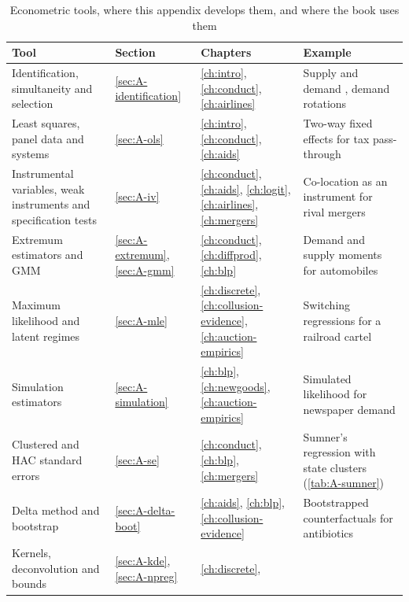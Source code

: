 \begin{table}[htbp]
\centering
\caption{Econometric tools, where this appendix develops them, and where the book uses them}
\label{tab:A-map}
\footnotesize
\begin{tabularx}{\textwidth}{@{}>{\raggedright\arraybackslash}p{}
>{\raggedright\arraybackslash}p{} >{\raggedright\arraybackslash}p{}
>{\raggedright\arraybackslash}X@{}}
\toprule
Tool & Section & Chapters & Example \\
\midrule
Identification, simultaneity and selection & \ref{sec:A-identification} & \ref{ch:intro}, \ref{ch:conduct},
\ref{ch:airlines} & Supply and demand \citep{Working1927}, demand rotations \citep{Bresnahan1982} \\
\addlinespace
Least squares, panel data and systems & \ref{sec:A-ols} & \ref{ch:intro}, \ref{ch:conduct}, \ref{ch:aids} &
Two-way fixed effects for tax pass-through \citep{Sumner1981} \\
\addlinespace
Instrumental variables, weak instruments and specification tests & \ref{sec:A-iv} & \ref{ch:conduct},
\ref{ch:aids}, \ref{ch:logit}, \ref{ch:airlines}, \ref{ch:mergers} & Co-location as an instrument for rival mergers
\citep{Dafny2009} \\
\addlinespace
Extremum estimators and GMM & \ref{sec:A-extremum}, \ref{sec:A-gmm} & \ref{ch:conduct}, \ref{ch:diffprod},
\ref{ch:blp} & Demand and supply moments for automobiles \citep{BerryLevinsohnPakes1995} \\
\addlinespace
Maximum likelihood and latent regimes & \ref{sec:A-mle} & \ref{ch:discrete}, \ref{ch:collusion-evidence},
\ref{ch:auction-empirics} & Switching regressions for a railroad cartel \citep{Porter1983,Ellison1994} \\
\addlinespace
Simulation estimators & \ref{sec:A-simulation} & \ref{ch:blp}, \ref{ch:newgoods}, \ref{ch:auction-empirics} &
Simulated likelihood for newspaper demand \citep{Gentzkow2007} \\
\addlinespace
Clustered and HAC standard errors & \ref{sec:A-se} & \ref{ch:conduct}, \ref{ch:blp}, \ref{ch:mergers} & Sumner's
regression with state clusters (\cref{tab:A-sumner}) \\
\addlinespace
Delta method and bootstrap & \ref{sec:A-delta-boot} & \ref{ch:aids}, \ref{ch:blp}, \ref{ch:collusion-evidence} &
Bootstrapped counterfactuals for antibiotics \citep{ChaudhuriGoldbergJia2006} \\
\addlinespace
Kernels, deconvolution and bounds & \ref{sec:A-kde}, \ref{sec:A-npreg} & \ref{ch:discrete},

\end{tabularx}
\end{table}
